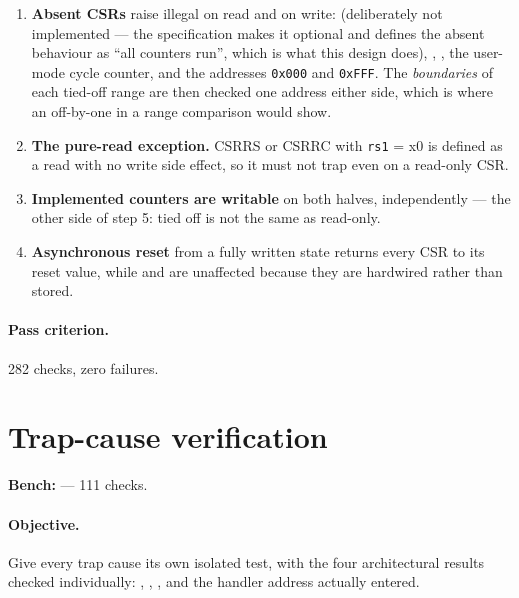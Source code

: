 \begin{enumerate}[leftmargin=*,itemsep=3pt]
\item[\textbf{6}] \textbf{Absent CSRs} raise illegal on read and on write:
 (deliberately not implemented --- the specification makes it
optional and defines the absent behaviour as ``all counters run'', which is what
this design does), , , the user-mode cycle counter,
and the addresses \texttt{0x000} and \texttt{0xFFF}. The \emph{boundaries} of
each tied-off range are then checked one address either side, which is where an
off-by-one in a range comparison would show.

\item[\textbf{7}] \textbf{The pure-read exception.} CSRRS or CSRRC with
\texttt{rs1} = x0 is defined as a read with no write side effect, so it must not
trap even on a read-only CSR.

\item[\textbf{8}] \textbf{Implemented counters are writable} on both halves,
independently --- the other side of step 5: tied off is not the same as
read-only.

\item[\textbf{9}] \textbf{Asynchronous reset} from a fully written state returns
every CSR to its reset value, while  and  are unaffected
because they are hardwired rather than stored.
\end{enumerate}

\paragraph{Pass criterion.} 282 checks, zero failures.

\section{Trap-cause verification}
\label{sec:vp-traps}

\textbf{Bench:}  --- 111 checks.

\paragraph{Objective.} Give every trap cause its own isolated test, with the
four architectural results checked individually: , ,
, and the handler address actually entered.

